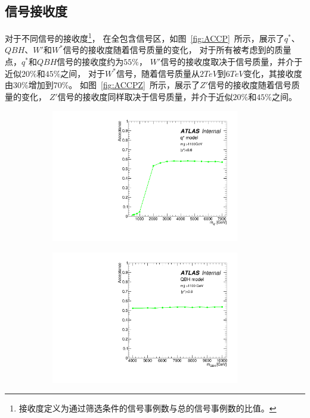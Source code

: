\subsection{信号接收度}
\label{sec:DijetSelection3}

对于不同信号的接收度\footnote{接收度定义为通过筛选条件的信号事例数与总的信号事例数的比值。}，
在全包含信号区，如图~\ref{fig:ACCP}~所示，展示了$q^*$、$QBH$、$W'$和$W^*$信号的接收度随着信号质量的变化，
对于所有被考虑到的质量点，$q^*$和$QBH$信号的接收度约为$55\%$，
$W'$信号的接收度取决于信号质量，并介于近似$20\%$和$45\%$之间，
对于$W^*$信号，随着信号质量从$2TeV$到$6TeV$变化，其接收度由$30\%$增加到$70\%$。
如图~\ref{fig:ACCPZ}~所示，展示了$Z'$信号的接收度随着信号质量的变化，
$Z'$信号的接收度同样取决于信号质量，并介于近似$20\%$和$45\%$之间。

\begin{figure}[htbp]
  \begin{subfigure}{.5\textwidth}
  \centering
   \includegraphics[width=0.9\textwidth]{figuresDijet/03-BenchmarkSignals/Acc_Qstar.pdf}
   \caption{}
   \label{fig:QStar1}
  \end{subfigure}
  \begin{subfigure}{.5\textwidth}
  \centering
   \includegraphics[width=0.9\textwidth]{figuresDijet/03-BenchmarkSignals/Acc_QBH.pdf}

\end{subfigure}
\end{figure}
